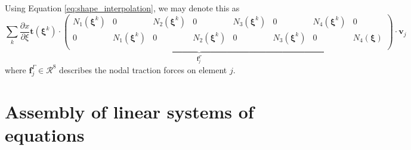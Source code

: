 Using Equation \eqref{eq:shape_interpolation}, we may denote this as 
\setlength\arraycolsep{-5pt}
\begin{equation}
    \underbrace{\sum_k \frac{\partial x}{\partial \xi} \mathbf{t}(\pmb{\xi}^k) \cdot
    \begin{pmatrix}
            N_1(\pmb{\xi}^k) & 0 & N_2(\pmb{\xi}^k) & 0 & N_3(\pmb{\xi}^k) & 0 & N_4(\pmb{\xi}^k) & 0\\
            0 & N_1(\pmb{\xi}^k) & 0 & N_2(\pmb{\xi}^k) & 0 & N_3(\pmb{\xi}^k) & 0 & N_4(\pmb{\xi})\\
    \end{pmatrix}}_{\mathbf{f}^\Gamma_j}
    \cdot 
    \mathbf{v}_j
\end{equation}
\setlength\arraycolsep{5pt}
where $\mathbf{f}^\Gamma_j \in \mathcal{R}^8$ describes the nodal traction forces on element $j$. 

\section{Assembly of linear systems of equations}

